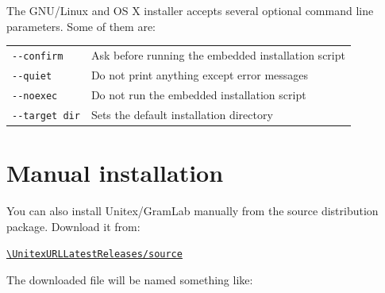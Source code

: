 \begin{samepage}
\noindent The GNU/Linux and OS X installer accepts several optional command line parameters. Some of them are:
\begin{table}[!htbp]
\centering
\begin{tabular}{ll}
\texttt{-\/-confirm}    & Ask before running the embedded installation script\\
\texttt{-\/-quiet}      & Do not print anything except error messages\\
\texttt{-\/-noexec}     & Do not run the embedded installation script\\
\texttt{-\/-target dir} & Sets the default installation directory
\end{tabular}
\end{table}

\end{samepage}

\section{Manual installation}

\begin{samepage}

You can also install Unitex/GramLab manually from the source distribution package. Download it from:
\nopagebreak
\begin{center}
{\tt\url{\UnitexURLLatestReleases/source}}
\end{center}

\noindent The downloaded file will be named something like:
\begin{flushleft}
{\tt \UnitexPackageSource{}}
\end{flushleft}

\end{samepage}

